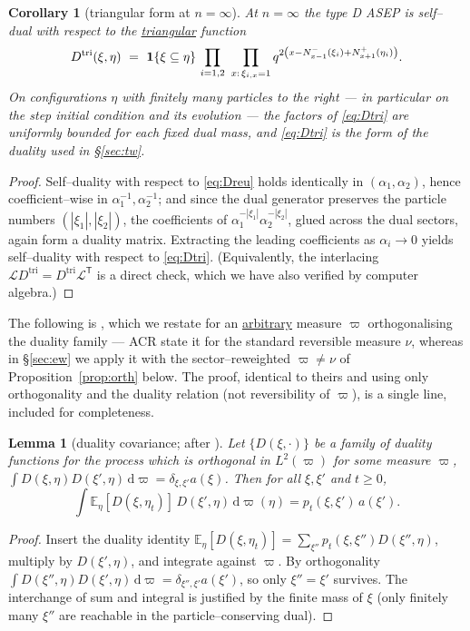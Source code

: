 \documentclass[11pt]{article}
\theoremstyle{plain}
\newtheorem{lemma}[theorem]{Lemma}
\newtheorem{corollary}[theorem]{Corollary}
\theoremstyle{definition}
\theoremstyle{remark}
\newcommand{\E}{\mathbb{E}}\newcommand{\PP}{\mathbb{P}}\newcommand{\dd}{\,\mathrm{d}}
\newcommand{\cL}{\mathcal L}\newcommand{\cO}{\mathcal O}\newcommand{\cE}{\mathcal E}
\begin{document}
\begin{corollary}[triangular form at $n=\infty$]\label{cor:tri}
At $n=\infty$ the type D ASEP is self--dual with respect to the \underline{triangular}
function
\begin{equation}\label{eq:Dtri}
  D^{\mathrm{tri}}(\xi,\eta)\ =\ \mathbf 1\{\xi\subseteq\eta\}\,
  \prod_{i=1,2}\ \prod_{x:\,\xi_{i,x}=1}
  q^{2\left(x-N^-_{x-1}(\xi_i)+N^+_{x+1}(\eta_i)\right)}.
\end{equation}
On configurations $\eta$ with finitely many particles to
the right --- in particular on the step initial condition and its evolution --- the
factors of \eqref{eq:Dtri} are uniformly bounded for each fixed dual mass, and
\eqref{eq:Dtri} is the form of the duality used in \S\ref{sec:tw}.
\end{corollary}
\begin{proof}
Self--duality with respect to \eqref{eq:Dreu} holds identically in
$(\alpha_1,\alpha_2)$, hence coefficient--wise in $\alpha_1^{-1},\alpha_2^{-1}$; and
since the dual generator preserves the particle numbers $(|\xi_1|,|\xi_2|)$, the
coefficients of $\alpha_1^{-|\xi_1|}\alpha_2^{-|\xi_2|}$, glued across the dual
sectors, again form a duality matrix. Extracting the leading coefficients as
$\alpha_i\to0$ yields self--duality with respect to \eqref{eq:Dtri}. (Equivalently,
the interlacing $\cL D^{\mathrm{tri}}=D^{\mathrm{tri}}\cL^{\mathsf T}$ is a direct
check, which we have also verified by computer algebra.)
\end{proof}

The following is \cite[Lem.~2.1]{ACR}, which we restate for an \underline{arbitrary}
measure $\varpi$ orthogonalising the duality family --- ACR state it for the standard
reversible measure $\nu$, whereas in \S\ref{sec:ew} we apply it with the
sector--reweighted $\varpi\ne\nu$ of Proposition~\ref{prop:orth} below. The proof, identical
to theirs and using only orthogonality and the duality relation (not reversibility of
$\varpi$), is a single line, included for completeness.

\begin{lemma}[duality covariance; {after \cite[Lem.~2.1]{ACR}}]\label{lem:acr}
Let $\{D(\xi,\cdot)\}$ be a family of duality functions for the process which is
orthogonal in $L^2(\varpi)$ for some measure $\varpi$,
$\int D(\xi,\eta)D(\xi',\eta)\dd\varpi=\delta_{\xi,\xi'}a(\xi)$. Then for all
$\xi,\xi'$ and $t\ge0$,
\[
  \int \E_\eta[D(\xi,\eta_t)]\,D(\xi',\eta)\dd\varpi(\eta)=p_t(\xi,\xi')\,a(\xi').
\]
\end{lemma}
\begin{proof}
Insert the duality identity
$\E_\eta[D(\xi,\eta_t)]=\sum_{\xi''}p_t(\xi,\xi'')D(\xi'',\eta)$, multiply by
$D(\xi',\eta)$, and integrate against $\varpi$. By orthogonality
$\int D(\xi'',\eta)D(\xi',\eta)\dd\varpi=\delta_{\xi'',\xi'}a(\xi')$, so only
$\xi''=\xi'$
survives. The interchange of sum and integral is justified by the finite mass of
$\xi$ (only finitely many $\xi''$ are reachable in the particle--conserving dual).
\end{proof}
\end{document}
